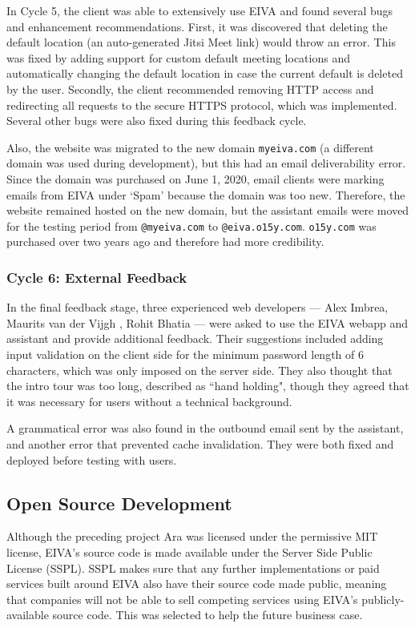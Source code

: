 \documentclass{article}
\begin{document}
In Cycle 5, the client was able to extensively use EIVA and found several bugs and enhancement recommendations. First, it was discovered that deleting the default location (an auto-generated Jitsi Meet link) would throw an error. This was fixed by adding support for custom default meeting locations and automatically changing the default location in case the current default is deleted by the user. Secondly, the client recommended removing HTTP access and redirecting all requests to the secure HTTPS protocol, which was implemented. Several other bugs were also fixed during this feedback cycle.

Also, the website was migrated to the new domain \texttt{myeiva.com} (a different domain was used during development), but this had an email deliverability error. Since the domain was purchased on June 1, 2020, email clients were marking emails from EIVA under `Spam' because the domain was too new. Therefore, the website remained hosted on the new domain, but the assistant emails were moved for the testing period from \texttt{@myeiva.com} to \texttt{@eiva.o15y.com}. \texttt{o15y.com} was purchased over two years ago and therefore had more credibility.

\subsubsection{Cycle 6: External Feedback}

In the final feedback stage, three experienced web developers --- Alex Imbrea, Maurits van der Vijgh , Rohit Bhatia --- were asked to use the EIVA webapp and assistant and provide additional feedback. Their suggestions included adding input validation on the client side for the minimum password length of 6 characters, which was only imposed on the server side. They also thought that the intro tour was too long, described as ``hand holding", though they agreed that it was necessary for users without a technical background.

A grammatical error was also found in the outbound email sent by the assistant, and another error that prevented cache invalidation. They were both fixed and deployed before testing with users.

\subsection{Open Source Development}

Although the preceding project Ara was licensed under the permissive MIT license, EIVA's source code is made available under the Server Side Public License (SSPL). SSPL makes sure that any further implementations or paid services built around EIVA also have their source code made public, meaning that companies will not be able to sell competing services using EIVA's publicly-available source code. This was selected to help the future business case.
\end{document}
